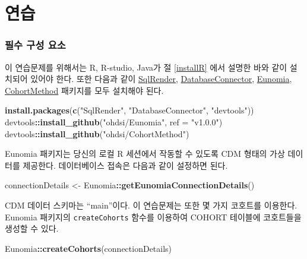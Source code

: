 \documentclass[11pt]{book}
\newenvironment{Shaded}{\begin{snugshade}}{\end{snugshade}}
\newcommand{\KeywordTok}[1]{\textcolor[rgb]{0.13,0.29,0.53}{\textbf{#1}}}
\newcommand{\DataTypeTok}[1]{\textcolor[rgb]{0.13,0.29,0.53}{#1}}
\newcommand{\StringTok}[1]{\textcolor[rgb]{0.31,0.60,0.02}{#1}}
\newcommand{\OperatorTok}[1]{\textcolor[rgb]{0.81,0.36,0.00}{\textbf{#1}}}
\newcommand{\NormalTok}[1]{#1}
\theoremstyle{definition}
\theoremstyle{definition}
\theoremstyle{definition}
\theoremstyle{remark}
\begin{document}
\section{연습}\label{-1}

\subsubsection*{필수 구성 요소}\label{---1}

이 연습문제를 위해서는 R, R-studio, Java가 절 \ref{installR} 에서 설명한
바와 같이 설치되어 있어야 한다. 또한 다음과 같이
\href{https://ohdsi.github.io/SqlRender/}{SqlRender},
\href{https://ohdsi.github.io/DatabaseConnector/}{DatabaseConnector},
\href{https://ohdsi.github.io/Eunomia/}{Eunomia},
\href{https://ohdsi.github.io/CohortMethod/}{CohortMethod} 패키지를 모두
설치해야 된다.

\begin{Shaded}
\begin{Highlighting}[]
\KeywordTok{install.packages}\NormalTok{(}\KeywordTok{c}\NormalTok{(}\StringTok{"SqlRender"}\NormalTok{, }\StringTok{"DatabaseConnector"}\NormalTok{, }\StringTok{"devtools"}\NormalTok{))}
\NormalTok{devtools}\OperatorTok{::}\KeywordTok{install_github}\NormalTok{(}\StringTok{"ohdsi/Eunomia"}\NormalTok{, }\DataTypeTok{ref =} \StringTok{"v1.0.0"}\NormalTok{)}
\NormalTok{devtools}\OperatorTok{::}\KeywordTok{install_github}\NormalTok{(}\StringTok{"ohdsi/CohortMethod"}\NormalTok{)}
\end{Highlighting}
\end{Shaded}

Eunomia 패키지는 당신의 로컬 R 세션에서 작동할 수 있도록 CDM 형태의 가상
데이터를 제공한다. 데이터베이스 접속은 다음과 같이 설정하면 된다.

\begin{Shaded}
\begin{Highlighting}[]
\NormalTok{connectionDetails <-}\StringTok{ }\NormalTok{Eunomia}\OperatorTok{::}\KeywordTok{getEunomiaConnectionDetails}\NormalTok{()}
\end{Highlighting}
\end{Shaded}

CDM 데이터 스키마는 ``main''이다. 이 연습문제는 또한 몇 가지 코호트를
이용한다. Eunomia 패키지의 \texttt{createCohorts} 함수를 이용하여 COHORT
테이블에 코호트들을 생성할 수 있다.

\begin{Shaded}
\begin{Highlighting}[]
\NormalTok{Eunomia}\OperatorTok{::}\KeywordTok{createCohorts}\NormalTok{(connectionDetails)}
\end{Highlighting}
\end{Shaded}
\end{document}
